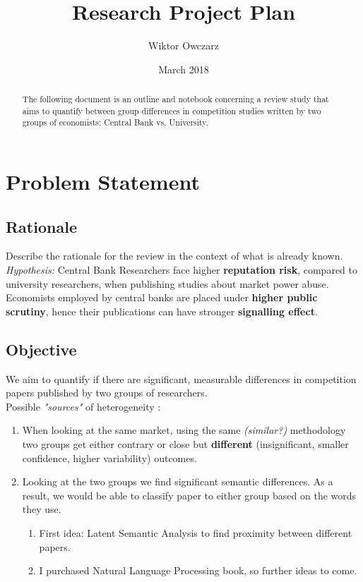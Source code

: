 \documentclass{article}
\title{\vspace{-2.5cm} Research Project Plan}
\author{Wiktor Owczarz}
\date{March 2018}
\begin{document}
\maketitle

\begin{minipage}{0.8\textwidth}
\begin{abstract}
   \noindent The following document is an outline and notebook concerning a review study that aims to quantify between group differences in competition studies written by two groups of economists: Central Bank  vs. University.
\end{abstract}
\end{minipage}

\section{Problem Statement}

\subsection*{Rationale}
Describe the rationale for the review in the context of what is already known.\\

\newline \noindent
\textit{Hypothesis:} Central Bank Researchers face higher \textbf{reputation risk}, compared to university researchers, when publishing studies about market power abuse. Economists employed by central banks are placed under \textbf{higher public scrutiny}, hence their publications can have stronger \textbf{signalling effect}.

\subsection*{Objective}
We aim to quantify if there are significant, measurable differences in competition papers published by two groups of researchers. \\

\newline \noindent
Possible \textit{"sources"} of heterogeneity :
\begin{enumerate}
    \item When looking at the same market, using the same \textit{(similar?)} methodology  two groups get either contrary or close but \textbf{different} (insignificant, smaller confidence, higher variability) outcomes.
    \item Looking at the two groups we find significant semantic differences. As a result, we would be able to classify paper to either group based on the words they use.
        \begin{enumerate}
            \item First idea: Latent Semantic Analysis to find proximity between different papers.
            \item I purchased Natural Language Processing book, so further ideas to come.
        \end{enumerate}

\end{enumerate}
\end{document}
